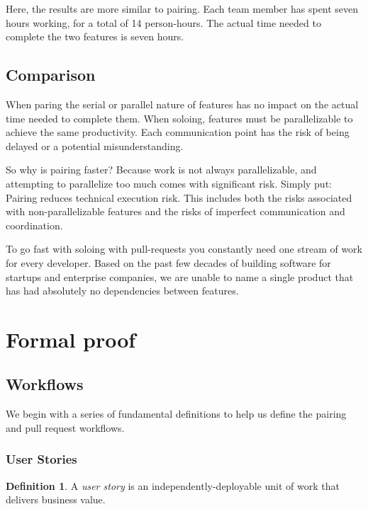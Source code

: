 \documentclass[letterpaper]{article}
\theoremstyle{definition}
\newtheorem{definition}[theorem]{Definition}
\begin{document}
    Here, the results are more similar to pairing.
    Each team member has spent seven hours working, for a total of 14 person-hours.
    The actual time needed to complete the two features is seven hours.

    \subsection{Comparison}\label{subsec:comparison}

    When paring the serial or parallel nature of features has no impact on the actual time needed to
    complete them.
    When soloing, features must be parallelizable to achieve the same productivity.
    Each communication point has the risk of being delayed or a potential misunderstanding.

    So why is pairing faster?
    Because work is not always parallelizable, and attempting to parallelize too much comes with significant risk.
    Simply put: Pairing reduces technical execution risk.
    This includes both the risks associated with non-parallelizable features and the risks of imperfect communication
    and coordination.

    To go fast with soloing with pull-requests you constantly need one stream of work for every developer.
    Based on the past few decades of building software for startups and enterprise companies, we are unable to name a
    single product that has had absolutely no dependencies between features.


    \section{Formal proof}\label{sec:formal-proof}

    \subsection{Workflows}\label{subsec:workflows}

    We begin with a series of fundamental definitions to help us define the pairing and pull request workflows.

    \subsubsection{User Stories}\label{subsubsec:user-stories}

    \begin{definition}
        A \textit{user story} is an independently-deployable unit of work that delivers business value.
    \end{definition}
\end{document}
